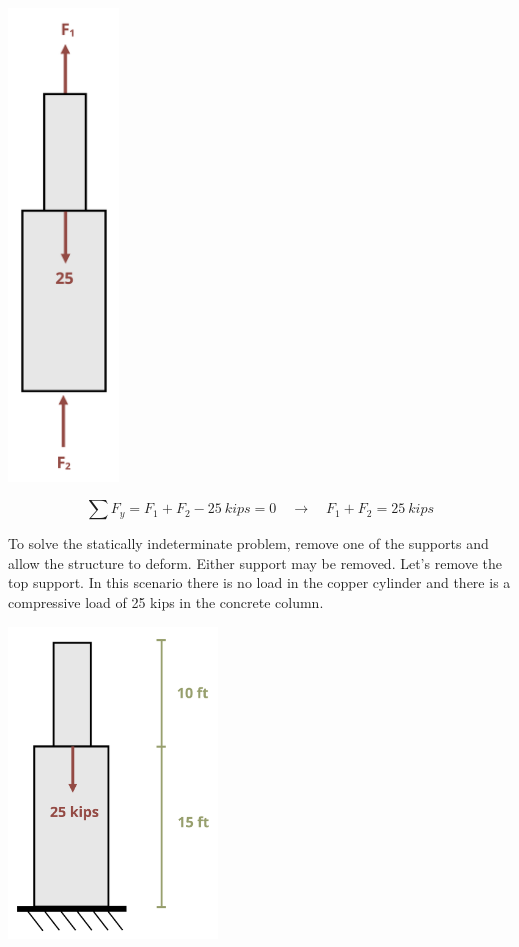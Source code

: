 \documentclass[
  letterpaper,
  DIV=11,
  numbers=noendperiod]{scrreprt}
\begin{document}
\begin{tcolorbox}
\begin{tcolorbox}
\begin{center}
\includegraphics[width=1.15625in,height=\textheight]{images/PNGs/Example 5.5 part 2.png}
\end{center}

\[
\sum F_y=F_1+F_2-25{~kips}=0 \quad\rightarrow\quad F_1+F_2=25{~kips}
\]

To solve the statically indeterminate problem, remove one of the
supports and allow the structure to deform. Either support may be
removed. Let's remove the top support. In this scenario there is no load
in the copper cylinder and there is a compressive load of 25 kips in the
concrete column.

\begin{center}
\includegraphics[width=2.1875in,height=\textheight]{images/PNGs/Example 5.5 part 3.png}
\end{center}


\end{tcolorbox}
\end{tcolorbox}
\end{document}

